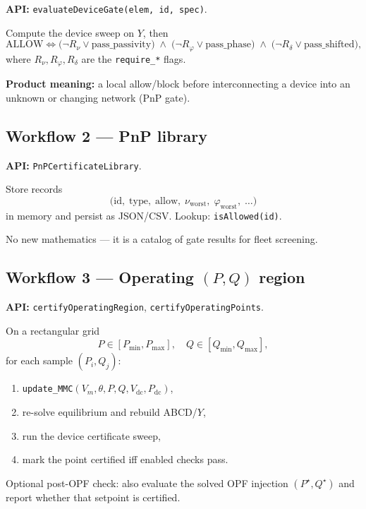 \documentclass[11pt,a4paper]{article}
\theoremstyle{definition}
\begin{document}
\textbf{API:} \texttt{evaluateDeviceGate(elem, id, spec)}.

Compute the device sweep on $Y$, then
\begin{equation}
  \mathrm{ALLOW}
  \iff
  \bigl(\neg R_\nu \lor \mathrm{pass\_passivity}\bigr)
  \;\land\;
  \bigl(\neg R_\varphi \lor \mathrm{pass\_phase}\bigr)
  \;\land\;
  \bigl(\neg R_\delta \lor \mathrm{pass\_shifted}\bigr),
\end{equation}
where $R_\nu,R_\varphi,R_\delta$ are the \texttt{require\_*} flags.

\textbf{Product meaning:} a local allow/block before interconnecting a device
into an unknown or changing network (PnP gate).

\subsection{Workflow 2 --- PnP library}

\textbf{API:} \texttt{PnPCertificateLibrary}.

Store records
\[
  \bigl(\mathrm{id},\;\mathrm{type},\;\mathrm{allow},\;
  \nu_{\mathrm{worst}},\;\varphi_{\mathrm{worst}},\;\ldots\bigr)
\]
in memory and persist as JSON/CSV. Lookup: \texttt{isAllowed(id)}.

No new mathematics --- it is a catalog of gate results for fleet screening.

\subsection{Workflow 3 --- Operating $(P,Q)$ region}

\textbf{API:} \texttt{certifyOperatingRegion}, \texttt{certifyOperatingPoints}.

On a rectangular grid
\begin{equation}
  P\in[P_{\min},P_{\max}],\quad
  Q\in[Q_{\min},Q_{\max}],
\end{equation}
for each sample $(P_i,Q_j)$:
\begin{enumerate}[leftmargin=*]
  \item \texttt{update\_MMC}$(V_m,\theta,P,Q,V_{\mathrm{dc}},P_{\mathrm{dc}})$,
  \item re-solve equilibrium and rebuild ABCD/$Y$,
  \item run the device certificate sweep,
  \item mark the point certified iff enabled checks pass.
\end{enumerate}
Optional post-OPF check: also evaluate the solved OPF injection $(P^\star,Q^\star)$
and report whether that setpoint is certified.
\end{document}
